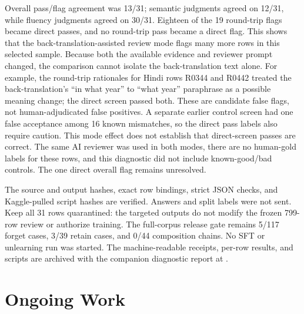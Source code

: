 \documentclass[10pt,a4paper]{article}
\begin{document}
Overall pass/flag agreement was 13/31; semantic judgments agreed on 12/31, while fluency judgments agreed on 30/31. Eighteen of the 19 round-trip flags became direct passes, and no round-trip pass became a direct flag. This shows that the back-translation-assisted review mode flags many more rows in this selected sample. Because both the available evidence and reviewer prompt changed, the comparison cannot isolate the back-translation text alone. For example, the round-trip rationales for Hindi rows R0344 and R0442 treated the back-translation's “in what year” to “what year” paraphrase as a possible meaning change; the direct screen passed both. These are candidate false flags, not human-adjudicated false positives. A separate earlier control screen had one false acceptance among 16 known mismatches, so the direct pass labels also require caution. This mode effect does not establish that direct-screen passes are correct. The same AI reviewer was used in both modes, there are no human-gold labels for these rows, and this diagnostic did not include known-good/bad controls. The one direct overall flag remains unresolved.

The source and output hashes, exact row bindings, strict JSON checks, and Kaggle-pulled script hashes are verified. Answers and split labels were not sent. Keep all 31 rows quarantined: the targeted outputs do not modify the frozen 799-row review or authorize training. The full-corpus release gate remains 5/117 forget cases, 3/39 retain cases, and 0/44 composition chains. No SFT or unlearning run was started. The machine-readable receipts, per-row results, and scripts are archived with the companion diagnostic report at .

\section{Ongoing Work}
\end{document}
